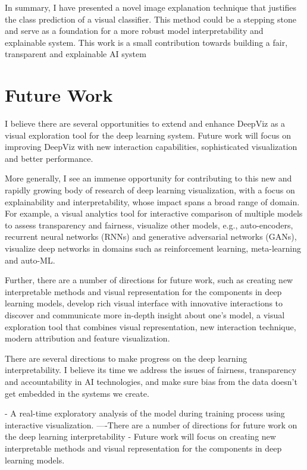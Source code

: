 In summary, I have presented a novel image explanation technique that justifies the class prediction of a visual classifier. This method could be a  stepping stone and serve as a foundation for a more robust model interpretability and explainable system. This work is a small contribution towards building a fair, transparent and explainable AI system

\section{Future Work}

I believe there are several opportunities to extend and enhance DeepViz as a visual exploration tool for the deep learning system. Future work will focus on improving DeepViz with new interaction capabilities, sophisticated visualization and better performance.

More generally, I see an immense opportunity for contributing to this new and rapidly growing body of research of deep learning visualization, with a focus on explainability and interpretability, whose impact spans a broad range of domain. For example, a visual analytics tool for interactive comparison of multiple models to assess transparency and fairness, visualize other models, e.g., auto-encoders, recurrent neural networks (RNNs) and generative adversarial networks (GANs), visualize deep networks in domains such as reinforcement learning, meta-learning and auto-ML.

Further, there are a number of directions for future work, such as creating new interpretable methods and visual representation for the components in deep learning models, develop rich visual interface with innovative interactions to discover and communicate more in-depth insight about one's model, a visual exploration tool that combines visual representation, new interaction technique, modern attribution and feature visualization.

There are several directions to make progress on the deep learning interpretability. I believe its time we address the issues of fairness, transparency and accountability in AI technologies, and make sure bias from the data doesn't get embedded in the systems we create.


\iffalse %

- A real-time exploratory analysis of the model during training process using interactive visualization. 
----There are a number of directions for future work on the deep learning interpretability
- Future work will focus on creating new interpretable methods and visual representation for the components in deep learning models.

